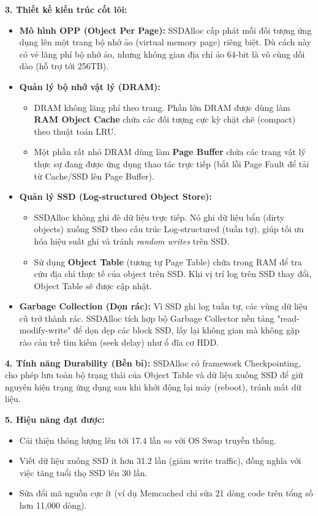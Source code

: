 \documentclass[12pt,a4paper]{article}
\begin{document}
\textbf{3. Thiết kế kiến trúc cốt lõi:}
\begin{itemize}
    \item \textbf{Mô hình OPP (Object Per Page):} SSDAlloc cấp phát mỗi đối tượng ứng dụng lên một trang bộ nhớ ảo (virtual memory page) riêng biệt. Dù cách này có vẻ lãng phí bộ nhớ ảo, nhưng không gian địa chỉ ảo 64-bit là vô cùng dồi dào (hỗ trợ tới 256TB).
    \item \textbf{Quản lý bộ nhớ vật lý (DRAM):}
    \begin{itemize}
        \item DRAM không lãng phí theo trang. Phần lớn DRAM được dùng làm \textbf{RAM Object Cache} chứa các đối tượng cực kỳ chặt chẽ (compact) theo thuật toán LRU.
        \item Một phần rất nhỏ DRAM dùng làm \textbf{Page Buffer} chứa các trang vật lý thực sự đang được ứng dụng thao tác trực tiếp (bắt lỗi Page Fault để tải từ Cache/SSD lên Page Buffer).
    \end{itemize}
    \item \textbf{Quản lý SSD (Log-structured Object Store):}
    \begin{itemize}
        \item SSDAlloc không ghi đè dữ liệu trực tiếp. Nó ghi dữ liệu bẩn (dirty objects) xuống SSD theo cấu trúc Log-structured (tuần tự), giúp tối ưu hóa hiệu suất ghi và tránh \textit{random writes} trên SSD.
        \item Sử dụng \textbf{Object Table} (tương tự Page Table) chứa trong RAM để tra cứu địa chỉ thực tế của object trên SSD. Khi vị trí log trên SSD thay đổi, Object Table sẽ được cập nhật.
    \end{itemize}
    \item \textbf{Garbage Collection (Dọn rác):} Vì SSD ghi log tuần tự, các vùng dữ liệu cũ trở thành rác. SSDAlloc tích hợp bộ Garbage Collector nền tảng "read-modify-write" để dọn dẹp các block SSD, lấy lại không gian mà không gặp rào cản trễ tìm kiếm (seek delay) như ổ đĩa cơ HDD.
\end{itemize}

\textbf{4. Tính năng Durability (Bền bỉ):}
SSDAlloc có framework Checkpointing, cho phép lưu toàn bộ trạng thái của Object Table và dữ liệu xuống SSD để giữ nguyên hiện trạng ứng dụng sau khi khởi động lại máy (reboot), tránh mất dữ liệu.

\textbf{5. Hiệu năng đạt được:}
\begin{itemize}
    \item Cải thiện thông lượng lên tới 17.4 lần so với OS Swap truyền thống.
    \item Viết dữ liệu xuống SSD ít hơn 31.2 lần (giảm write traffic), đồng nghĩa với việc tăng tuổi thọ SSD lên 30 lần.
    \item Sửa đổi mã nguồn cực ít (ví dụ Memcached chỉ sửa 21 dòng code trên tổng số hơn 11,000 dòng).
\end{itemize}
\end{document}
